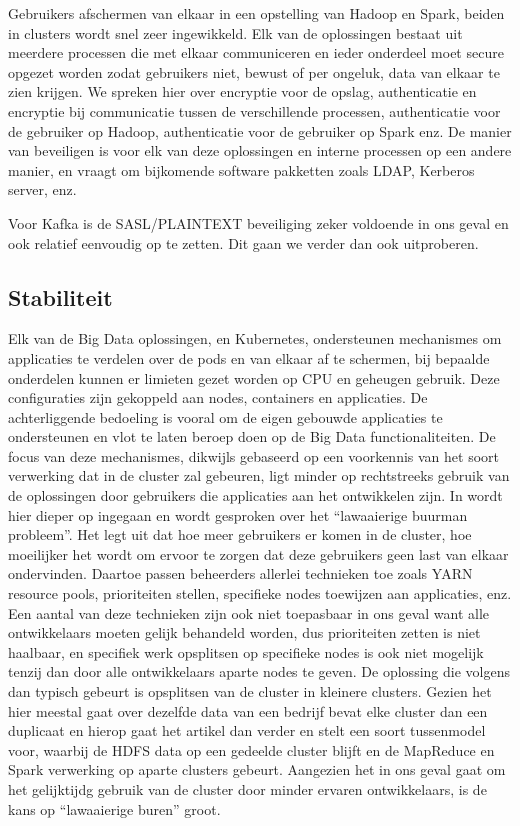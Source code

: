 Gebruikers afschermen van elkaar in een opstelling van Hadoop en Spark, beiden in clusters wordt snel zeer ingewikkeld. Elk van de oplossingen bestaat uit meerdere processen die met elkaar communiceren en ieder onderdeel moet secure opgezet worden zodat gebruikers niet, bewust of per ongeluk, data van elkaar te zien krijgen. We spreken hier over encryptie voor de opslag, authenticatie en encryptie bij communicatie tussen de verschillende processen, authenticatie voor de gebruiker op Hadoop, authenticatie voor de gebruiker op Spark enz.
De manier van beveiligen is voor elk van deze oplossingen en interne processen op een andere manier, en vraagt om bijkomende software pakketten zoals LDAP, Kerberos server, enz.

Voor Kafka is de SASL/PLAINTEXT beveiliging zeker voldoende in ons geval en ook relatief eenvoudig op te zetten. Dit gaan we verder dan ook uitproberen.

\subsection{Stabiliteit}
Elk van de Big Data oplossingen, en Kubernetes, ondersteunen mechanismes om applicaties te verdelen over de pods en van elkaar af te schermen, bij bepaalde onderdelen kunnen er limieten gezet worden op CPU en geheugen gebruik. Deze configuraties zijn gekoppeld aan nodes, containers en applicaties. De achterliggende bedoeling is vooral om de eigen gebouwde applicaties te ondersteunen en vlot te laten beroep doen op de Big Data functionaliteiten. De focus van deze mechanismes, dikwijls gebaseerd op een voorkennis van het soort verwerking dat in de cluster zal gebeuren, ligt minder op rechtstreeks gebruik van de oplossingen door gebruikers die applicaties aan het ontwikkelen zijn.
\newline
\newline
In \textcite{Deane2019} wordt hier dieper op ingegaan en wordt gesproken over het ``lawaaierige buurman probleem''. Het legt uit dat hoe meer gebruikers er komen in de cluster, hoe moeilijker het wordt om ervoor te zorgen dat deze gebruikers geen last van elkaar ondervinden. Daartoe passen beheerders allerlei technieken toe zoals YARN resource pools, prioriteiten stellen, specifieke nodes toewijzen aan applicaties, enz. Een aantal van deze technieken zijn ook niet toepasbaar in ons geval want alle ontwikkelaars moeten gelijk behandeld worden, dus prioriteiten zetten is niet haalbaar, en specifiek werk opsplitsen op specifieke nodes is ook niet mogelijk tenzij dan door alle ontwikkelaars aparte nodes te geven.
De oplossing die volgens \textcite{Deane2019a} dan typisch gebeurt is opsplitsen van de cluster in kleinere clusters. Gezien het hier meestal gaat over dezelfde data van een bedrijf bevat elke cluster dan een duplicaat en hierop gaat het artikel dan verder en stelt een soort tussenmodel voor, waarbij de HDFS data op een gedeelde cluster blijft en de MapReduce en Spark verwerking op aparte clusters gebeurt.
\newline
Aangezien het in ons geval gaat om het gelijktijdg gebruik van de cluster door minder ervaren ontwikkelaars, is de kans op ``lawaaierige buren'' groot.


